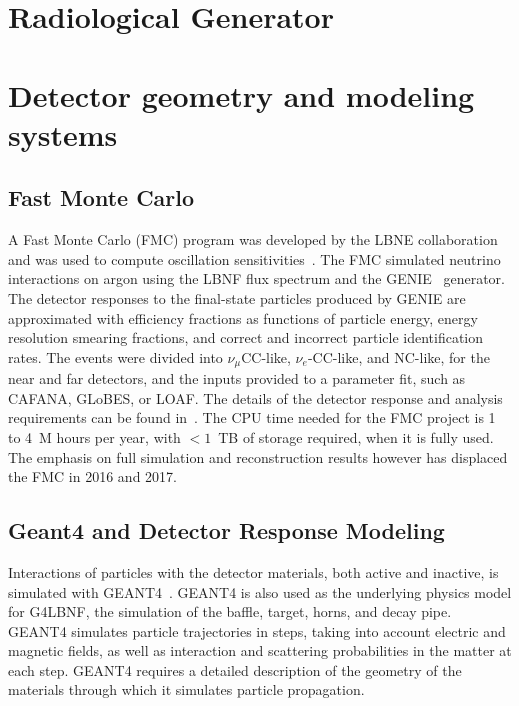 \section{Radiological Generator}

\section{Detector geometry and modeling systems}


\subsection{Fast Monte Carlo}

A Fast Monte Carlo (FMC) program was developed by the LBNE collaboration and was used to
compute oscillation sensitivities~\cite{cdr-vol-2}.  The FMC simulated neutrino interactions
on argon using the LBNF flux spectrum and the GENIE~\cite{GENIE} generator.  The detector
responses to the final-state particles produced by GENIE are approximated with efficiency
fractions as functions of particle energy, energy resolution smearing fractions, and
correct and incorrect particle identification rates.  The events were divided into
$\nu_\mu$CC-like, $\nu_e$-CC-like, and NC-like, for the near and far detectors, and the
inputs provided to a parameter fit, such as CAFANA, GLoBES, or LOAF.  The details of the
detector response and analysis requirements can be found in~\cite{cdr-vol-2}.  The CPU time needed
for the FMC project is 1 to 4~M hours per year, with $<1$~TB of storage required, when
it is fully used.  The emphasis on full simulation and reconstruction results however has
displaced the FMC in 2016 and 2017. 

\subsection{Geant4 and Detector Response Modeling}

Interactions of particles with the detector materials, both active and inactive, is simulated with 
GEANT4~\cite{GEANT4:NIM}.  GEANT4 is also used as the underlying physics model for G4LBNF, the
simulation of the baffle, target, horns, and decay pipe.  GEANT4 simulates particle trajectories in steps,
taking into account electric and magnetic fields, as well as interaction and scattering probabilities in the
matter at each step.  GEANT4 requires a detailed description of the geometry of the materials through which
it simulates particle propagation.

